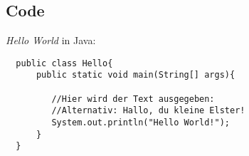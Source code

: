 \documentclass[a4paper, pdftex, ngerman, 11pt]{article}
\begin{document}
\subsection{Code}
\textit{Hello World} in Java:\\
\begin{lstlisting}
  public class Hello{
      public static void main(String[] args){
      
         //Hier wird der Text ausgegeben:
         //Alternativ: Hallo, du kleine Elster!
         System.out.println("Hello World!");
      }
  }
\end{lstlisting}
\end{document}
